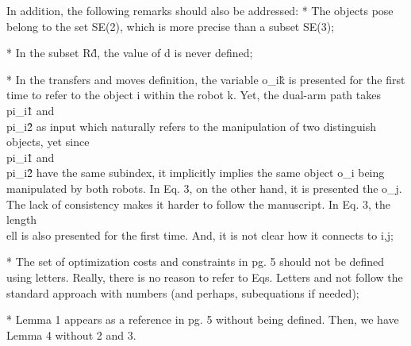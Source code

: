 \documentclass[journal]{IEEEtran}
\begin{document}
	\begin{partt}
		In addition, the following remarks should also be addressed:
		* The objects pose belong to the set SE(2), which is more precise than a subset SE(3);
	\end{partt}
	
	\begin{partt}
		* In the subset R\^d, the value of d is never defined;
	\end{partt}
	
	\begin{partt}
		* In the transfers and moves definition, the variable o\_i\^k is presented for the first time to refer to the object i within the robot k. Yet, the dual-arm path takes \\pi\_i\^1 and \\pi\_i\^2 as input which naturally refers to the manipulation of two distinguish objects, yet since \\pi\_i\^1 and \\pi\_i\^2 have the same subindex, it implicitly implies the same object o\_i being manipulated by both robots. In Eq. 3, on the other hand, it is presented the o\_j. The lack of consistency makes it harder to follow the manuscript. In Eq. 3, the length \\ell is also presented for the first time. And, it is not clear how it connects to i,j;
	\end{partt}
	
	\begin{partt}
		* The set of optimization costs and constraints in pg. 5 should not be defined using letters. Really, there is no reason to refer to Eqs. Letters and not follow the standard approach with numbers (and perhaps, subequations if needed);
	\end{partt}
	
	\begin{partt}
		* Lemma 1 appears as a reference in pg. 5 without being defined.  Then, we have Lemma 4 without 2 and 3.
	\end{partt}
	
\end{document}
